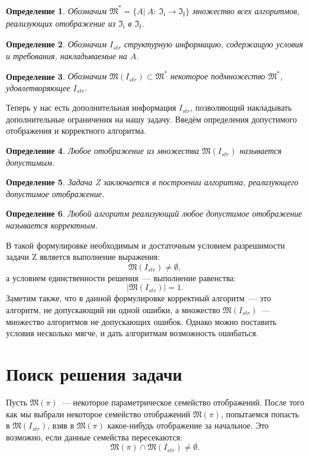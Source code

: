 \documentclass[a4paper, 12pt]{report}
\newtheorem{definition}{Определение}[chapter]
\begin{document}
\begin{definition}
Обозначим $\mathfrak{M}^* = \{A|\ A:\  \mathfrak{I_i}\rightarrow \mathfrak{I_f}\}$ множество всех алгоритмов, реализующих отображение из $\mathfrak{I_i}$ в $\mathfrak{I_f}$.
\end{definition}

\begin{definition}
Обозначим $I_{str}$ структурную информацию, содержащую условия и требования, накладываемые на $A$.
\end{definition}

\begin{definition}
Обозначим $\mathfrak{M}(I_{str}) \subset \mathfrak{M}^*$ некоторое подмножество $\mathfrak{M}^*$, удовлетворяющее $I_{str}$.
\end{definition}

Теперь у нас есть дополнительная информация $I_{str}$, позволяющий накладывать дополнительные ограничения на нашу задачу. Введём определения допустимого отображения и корректного алгоритма.

\begin{definition}
Любое отображение из множества $\mathfrak{M}(I_{str})$ называется допустимым.
\end{definition}

\begin{definition}
Задача Z заключается в построении алгоритма, реализующего допустимое отображение.
\end{definition}

\begin{definition}
Любой алгоритм реализующий любое допустимое отображение называется корректным.
\end{definition}

В такой формулировке необходимым и достаточным условием разрешимости задачи Z является выполнение выражения: \[
\mathfrak{M}(I_{str}) \neq \emptyset,
\]
а условием единственности решения~--- выполнение равенства:
\[
|\mathfrak{M}(I_{str})| = 1.
\]
Заметим также, что в данной формулировке корректный алгоритм~--- это алгоритм, не допускающий ни одной ошибки, а множество $\mathfrak{M}(I_{str})$~--- множество алгоритмов не допускающих ошибок. Однако можно поставить условия несколько мягче, и дать алгоритмам возможность ошибаться.

\section{Поиск решения задачи}
Пусть $\mathfrak{M}(\pi)$~--- некоторое параметрическое семейство отображений. После того как мы выбрали некоторое семейство отображений $\mathfrak{M}(\pi)$, попытаемся попасть в $\mathfrak{M}(I_{str})$, взяв в $\mathfrak{M}(\pi)$ какое-нибудь отображение за начальное. Это возможно, если данные семейства пересекаются:
\[
\mathfrak{M}(\pi) \cap \mathfrak{M}(I_{str}) \neq \emptyset.
\]
\end{document}
